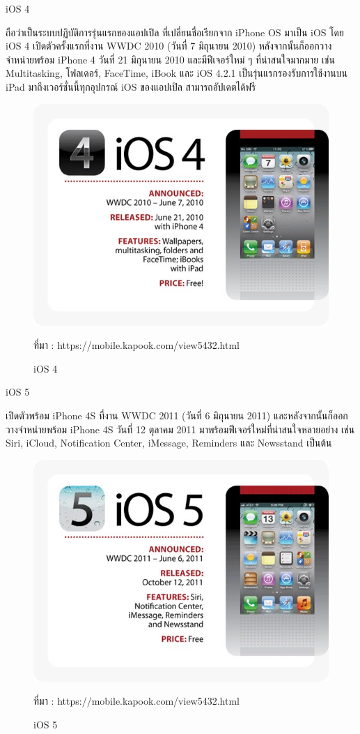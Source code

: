 	iOS 4 

	ถือว่าเป็นระบบปฏิบัติการรุ่นแรกของแอปเปิล ที่เปลี่ยนชื่อเรียกจาก iPhone OS มาเป็น iOS โดย iOS 4 เปิดตัวครั้งแรกที่งาน WWDC 2010 (วันที่ 7 มิถุนายน 2010) หลังจากนั้นก็ออกวางจำหน่ายพร้อม iPhone 4 วันที่ 21 มิถุนายน 2010 และมีฟีเจอร์ใหม่ ๆ ที่น่าสนใจมากมาย เช่น Multitasking, โฟลเดอร์, FaceTime, iBook และ iOS 4.2.1 เป็นรุ่นแรกรองรับการใช้งานบน iPad มาถึงเวอร์ชั่นนี้ทุกอุปกรณ์ iOS ของแอปเปิล สามารถอัปเดตได้ฟรี

	\begin{figure}[H]
		\centering
		\includegraphics[width=0.8\columnwidth]{Figures/2/iOS/iOS4}
		\caption{iOS 4}{ที่มา : https://mobile.kapook.com/view5432.html}
		\label{Fig:iosversion4}
	\end{figure}

	iOS 5 

	เปิดตัวพร้อม iPhone 4S ที่งาน WWDC 2011 (วันที่ 6 มิถุนายน 2011) และหลังจากนั้นก็ออกวางจำหน่ายพร้อม iPhone 4S วันที่ 12 ตุลาคม 2011 มาพร้อมฟีเจอร์ใหม่ที่น่าสนใจหลายอย่าง เช่น Siri, iCloud, Notification Center, iMessage, Reminders และ Newsstand เป็นต้น

	\begin{figure}[H]
		\centering
		\includegraphics[width=0.8\columnwidth]{Figures/2/iOS/iOS5}
		\caption{iOS 5}{ที่มา : https://mobile.kapook.com/view5432.html}
		\label{Fig:iosversion5}
	\end{figure}

